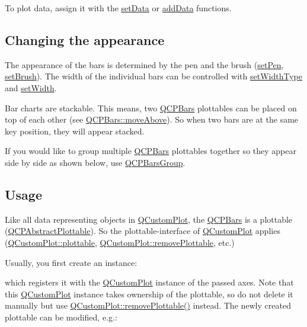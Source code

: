To plot data, assign it with the \hyperlink{class_q_c_p_bars_a6dc562ec7120a8521e1061f2134367e4}{set\+Data} or \hyperlink{class_q_c_p_bars_a323d6970d6d6e3166d89916a7f60f733}{add\+Data} functions.\hypertarget{class_q_c_p_bars_qcpbars-appearance}{}\subsection{Changing the appearance}\label{class_q_c_p_bars_qcpbars-appearance}
The appearance of the bars is determined by the pen and the brush (\hyperlink{class_q_c_p_abstract_plottable_ab74b09ae4c0e7e13142fe4b5bf46cac7}{set\+Pen}, \hyperlink{class_q_c_p_abstract_plottable_a7a4b92144dca6453a1f0f210e27edc74}{set\+Brush}). The width of the individual bars can be controlled with \hyperlink{class_q_c_p_bars_adcaa3b41281bb2c0f7949b341592fcc0}{set\+Width\+Type} and \hyperlink{class_q_c_p_bars_afec6116579d44d5b706e0fa5e5332507}{set\+Width}.

Bar charts are stackable. This means, two \hyperlink{class_q_c_p_bars}{Q\+C\+P\+Bars} plottables can be placed on top of each other (see \hyperlink{class_q_c_p_bars_ac22e00a6a41509538c21b04f0a57318c}{Q\+C\+P\+Bars\+::move\+Above}). So when two bars are at the same key position, they will appear stacked.

If you would like to group multiple \hyperlink{class_q_c_p_bars}{Q\+C\+P\+Bars} plottables together so they appear side by side as shown below, use \hyperlink{class_q_c_p_bars_group}{Q\+C\+P\+Bars\+Group}.

\hypertarget{class_q_c_p_bars_qcpbars-usage}{}\subsection{Usage}\label{class_q_c_p_bars_qcpbars-usage}
Like all data representing objects in \hyperlink{class_q_custom_plot}{Q\+Custom\+Plot}, the \hyperlink{class_q_c_p_bars}{Q\+C\+P\+Bars} is a plottable (\hyperlink{class_q_c_p_abstract_plottable}{Q\+C\+P\+Abstract\+Plottable}). So the plottable-\/interface of \hyperlink{class_q_custom_plot}{Q\+Custom\+Plot} applies (\hyperlink{class_q_custom_plot_a32de81ff53e263e785b83b52ecd99d6f}{Q\+Custom\+Plot\+::plottable}, \hyperlink{class_q_custom_plot_af3dafd56884208474f311d6226513ab2}{Q\+Custom\+Plot\+::remove\+Plottable}, etc.)

Usually, you first create an instance\+: 
\begin{DoxyCodeInclude}
\end{DoxyCodeInclude}
which registers it with the \hyperlink{class_q_custom_plot}{Q\+Custom\+Plot} instance of the passed axes. Note that this \hyperlink{class_q_custom_plot}{Q\+Custom\+Plot} instance takes ownership of the plottable, so do not delete it manually but use \hyperlink{class_q_custom_plot_af3dafd56884208474f311d6226513ab2}{Q\+Custom\+Plot\+::remove\+Plottable()} instead. The newly created plottable can be modified, e.\+g.\+: 
\begin{DoxyCodeInclude}
\end{DoxyCodeInclude}



